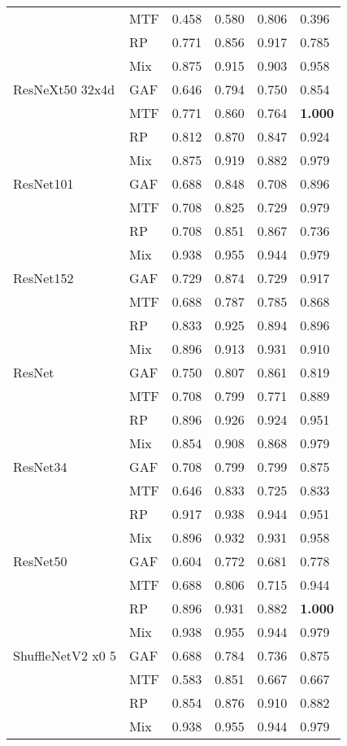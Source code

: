 \begin{longtable}[t]{llllll}
 & MTF & 0.458 & 0.580 & 0.806 & 0.396 \\
 & RP & 0.771 & 0.856 & 0.917 & 0.785 \\
 & Mix & 0.875 & 0.915 & 0.903 & 0.958 \\
ResNeXt50 32x4d & GAF & 0.646 & 0.794 & 0.750 & 0.854 \\
 & MTF & 0.771 & 0.860 & 0.764 & \textbf{1.000} \\
 & RP & 0.812 & 0.870 & 0.847 & 0.924 \\
 & Mix & 0.875 & 0.919 & 0.882 & 0.979 \\
ResNet101 & GAF & 0.688 & 0.848 & 0.708 & 0.896 \\
 & MTF & 0.708 & 0.825 & 0.729 & 0.979 \\
 & RP & 0.708 & 0.851 & 0.867 & 0.736 \\
 & Mix & 0.938 & 0.955 & 0.944 & 0.979 \\
ResNet152 & GAF & 0.729 & 0.874 & 0.729 & 0.917 \\
 & MTF & 0.688 & 0.787 & 0.785 & 0.868 \\
 & RP & 0.833 & 0.925 & 0.894 & 0.896 \\
 & Mix & 0.896 & 0.913 & 0.931 & 0.910 \\
ResNet & GAF & 0.750 & 0.807 & 0.861 & 0.819 \\
 & MTF & 0.708 & 0.799 & 0.771 & 0.889 \\
 & RP & 0.896 & 0.926 & 0.924 & 0.951 \\
 & Mix & 0.854 & 0.908 & 0.868 & 0.979 \\
ResNet34 & GAF & 0.708 & 0.799 & 0.799 & 0.875 \\
 & MTF & 0.646 & 0.833 & 0.725 & 0.833 \\
 & RP & 0.917 & 0.938 & 0.944 & 0.951 \\
 & Mix & 0.896 & 0.932 & 0.931 & 0.958 \\
ResNet50 & GAF & 0.604 & 0.772 & 0.681 & 0.778 \\
 & MTF & 0.688 & 0.806 & 0.715 & 0.944 \\
 & RP & 0.896 & 0.931 & 0.882 & \textbf{1.000} \\
 & Mix & 0.938 & 0.955 & 0.944 & 0.979 \\
ShuffleNetV2 x0 5 & GAF & 0.688 & 0.784 & 0.736 & 0.875 \\
 & MTF & 0.583 & 0.851 & 0.667 & 0.667 \\
 & RP & 0.854 & 0.876 & 0.910 & 0.882 \\
 & Mix & 0.938 & 0.955 & 0.944 & 0.979 \\

\end{longtable}
